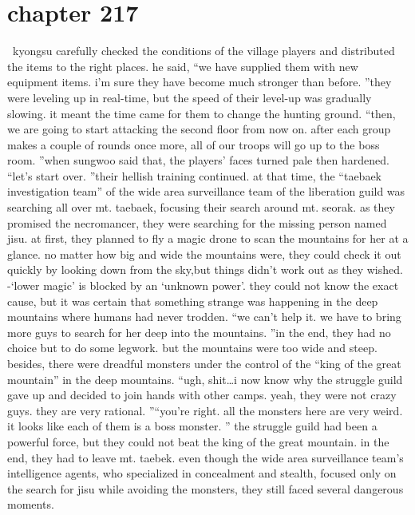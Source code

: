 \section{chapter 217}






 kyongsu carefully checked the conditions of the village players and distributed the items to the right places.
he said, “we have supplied them with new equipment items.
 i’m sure they have become much stronger than before.
”they were leveling up in real-time, but the speed of their level-up was gradually slowing.
 it meant the time came for them to change the hunting ground.
“then, we are going to start attacking the second floor from now on.
 after each group makes a couple of rounds once more, all of our troops will go up to the boss room.
”when sungwoo said that, the players’ faces turned pale then hardened.
“let’s start over.
”their hellish training continued.
at that time, the “taebaek investigation team” of the wide area surveillance team of the liberation guild was searching all over mt.
 taebaek, focusing their search around mt.
 seorak.
 as they promised the necromancer, they were searching for the missing person named jisu.
at first, they planned to fly a magic drone to scan the mountains for her at a glance.
 no matter how big and wide the mountains were, they could check it out quickly by looking down from the sky,but things didn’t work out as they wished.
-‘lower magic’ is blocked by an ‘unknown power’.
they could not know the exact cause, but it was certain that something strange was happening in the deep mountains where humans had never trodden.
“we can’t help it.
 we have to bring more guys to search for her deep into the mountains.
”in the end, they had no choice but to do some legwork.
but the mountains were too wide and steep.
 besides, there were dreadful monsters under the control of the “king of the great mountain” in the deep mountains.
“ugh, shit…i now know why the struggle guild gave up and decided to join hands with other camps.
 yeah, they were not crazy guys.
 they are very rational.
”“you’re right.
 all the monsters here are very weird.
 it looks like each of them is a boss monster.
”
the struggle guild had been a powerful force, but they could not beat the king of the great mountain.
 in the end, they had to leave mt.
 taebek.
even though the wide area surveillance team’s intelligence agents, who specialized in concealment and stealth, focused only on the search for jisu while avoiding the monsters, they still faced several dangerous moments.
